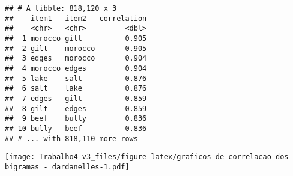 \documentclass[]{article}
\newenvironment{Shaded}{\begin{snugshade}}{\end{snugshade}}
\newcommand{\DataTypeTok}[1]{\textcolor[rgb]{0.13,0.29,0.53}{#1}}
\newcommand{\DecValTok}[1]{\textcolor[rgb]{0.00,0.00,0.81}{#1}}
\newcommand{\KeywordTok}[1]{\textcolor[rgb]{0.13,0.29,0.53}{\textbf{#1}}}
\newcommand{\NormalTok}[1]{#1}
\newcommand{\OperatorTok}[1]{\textcolor[rgb]{0.81,0.36,0.00}{\textbf{#1}}}
\newcommand{\StringTok}[1]{\textcolor[rgb]{0.31,0.60,0.02}{#1}}
\begin{document}
\begin{verbatim}
## # A tibble: 818,120 x 3
##    item1   item2   correlation
##    <chr>   <chr>         <dbl>
##  1 morocco gilt          0.905
##  2 gilt    morocco       0.905
##  3 edges   morocco       0.904
##  4 morocco edges         0.904
##  5 lake    salt          0.876
##  6 salt    lake          0.876
##  7 edges   gilt          0.859
##  8 gilt    edges         0.859
##  9 beef    bully         0.836
## 10 bully   beef          0.836
## # ... with 818,110 more rows
\end{verbatim}

\begin{Shaded}
\end{Shaded}

\texttt{[image: Trabalho4-v3\_files/figure-latex/graficos de correlacao dos bigramas - dardanelles-1.pdf]}
\end{document}
